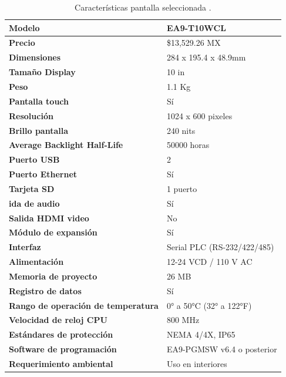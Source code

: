 \begin{table}[H]
	\centering
	\caption{Características pantalla seleccionada \cite{DDI2}.}
	\begin{tabular}{@{}|p{6.5cm}|p{5cm}|} 
		\hline
		\textbf{Modelo}&EA9-T10WCL
		\\ \hline
		\textbf{Precio}&\$13,529.26 MX
		\\ \hline
		\textbf{Dimensiones}&284 x 195.4 x 48.9mm
		\\ \hline
		\textbf{Tama\~{n}o Display}&10 in
		\\ \hline
		\textbf{Peso}&1.1 Kg
		\\ \hline
		\textbf{Pantalla touch}&Sí
		\\ \hline
		\textbf{Resolución}&1024 x 600 pixeles
		\\ \hline
		\textbf{Brillo pantalla}&240 nits
		\\ \hline
		\textbf{Average Backlight Half-Life}&50000 horas
		\\ \hline
		\textbf{Puerto USB}&2
		\\ \hline
		\textbf{Puerto Ethernet}&Sí
		\\ \hline
		\textbf{Tarjeta SD}&1 puerto
		\\ \hline
		\textbf{ida de audio}&Sí
		\\ \hline
		\textbf{Salida HDMI video}&No
		\\ \hline
		\textbf{Módulo de expansión}&Sí
		\\ \hline
		\textbf{Interfaz}&Serial PLC (RS-232/422/485)
		\\ \hline
		\textbf{Alimentación}&12-24 VCD /                                                       110 V AC
		\\ \hline
		\textbf{Memoria de proyecto}&26 MB
		\\ \hline
		\textbf{Registro de datos}&Sí
		\\ \hline
		\textbf{Rango de operación de temperatura}&0° a 50°C (32° a 122°F)
		\\ \hline
		\textbf{Velocidad de reloj CPU}&800 MHz
		\\ \hline
		\textbf{Estándares de protección}&NEMA 4/4X, IP65 
		\\ \hline
		\textbf{Software de programación}&EA9-PGMSW v6.4 o posterior
		\\ \hline
		\textbf{Requerimiento ambiental}&Uso en interiores
		\\ \hline
	\end{tabular}		
	\label{tabla:DisenoP5}
\end{table}

